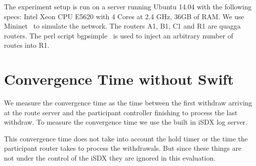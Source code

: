 The experiment setup is run on a server running Ubuntu 14.04 with the following specs: Intel Xeon CPU E5620 with 4 Cores at 2.4 GHz, 36GB of RAM. We use Mininet~\cite{mininet} to simulate the network. The routers A1, B1, C1 and R1 are quagga~\cite{quagga} routers. The perl script bgpsimple~\cite{bgpsimple} is used to inject an arbitrary number of routes into R1. 

\section{\label{chapter5:Convergence time without Swift}Convergence Time without Swift}

We measure the convergence time as the time between the first withdraw arriving at the route server and the participant controller finishing to process the last withdraw. To measure the convergence time we use the built in iSDX log server.

This convergence time does not take into account the hold timer or the time the participant router takes to process the withdrawals. But since these things are not under the control of the iSDX they are ignored in this evaluation.

